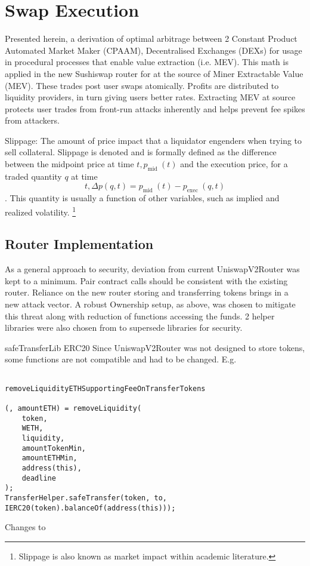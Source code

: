 \documentclass[runningheads]{llncs}
\begin{document}
\section{Swap Execution}
	

Presented herein, a derivation of optimal arbitrage between 2 Constant Product Automated Market Maker (CPAAM), Decentralised Exchanges (DEXs) for usage in procedural processes that enable value extraction (i.e. MEV).
This math is applied in the new Sushiswap router for at the source of  Miner Extractable Value (MEV). These trades post user swaps atomically. 
Profits are distributed to liquidity providers, in turn giving users better rates. Extracting MEV at source protects user trades from front-run attacks inherently and helps prevent fee spikes from attackers.


Slippage: The amount of price impact that a liquidator engenders when trying to sell collateral.
Slippage is denoted  and is formally defined as the difference between the midpoint price at time $t, p_{\text {mid }}(t)$ and the execution price,   for a traded quantity $q$ at time $$t, \Delta p(q, t)=p_{\text {mid }}(t)-p_{\text {exec }}(q, t)$$. This quantity is usually a function of other variables, such as implied and realized volatility. 
\footnote{Slippage is also known as market impact within academic literature.}


\subsection{Router Implementation}
As a general approach to security, deviation from current UniswapV2Router was kept to a minimum. Pair contract calls should be consistent with the existing router. Reliance on the new router storing and transferring tokens brings in a new attack vector. A robust Ownership setup, as above, was chosen to mitigate this threat along with reduction of functions accessing the funds. 2 helper libraries were also chosen from  to supersede  libraries for security.

safeTransferLib
ERC20
Since UniswapV2Router was not designed to store tokens, some functions are not compatible and had to be changed. E.g.

\begin{verbatim}

removeLiquidityETHSupportingFeeOnTransferTokens

(, amountETH) = removeLiquidity(
    token,
    WETH,
    liquidity,
    amountTokenMin,
    amountETHMin,
    address(this),
    deadline
);
TransferHelper.safeTransfer(token, to, IERC20(token).balanceOf(address(this)));
\end{verbatim}
Changes to
\end{document}
